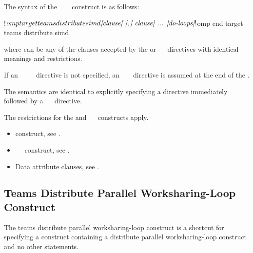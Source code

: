 \begin{fortranspecific}
The syntax of the ~~~ construct is as follows:

\begin{ompfPragma}
!$omp target teams distribute simd \plc{[clause[ [},\plc{] clause] ... ]}
    \plc{do-loops}
\plc{[}!$omp end target teams distribute simd\plc{]}
\end{ompfPragma}

where  can be any of the clauses accepted by the  or
~~ directives with identical meanings and restrictions.

If an ~~~~ directive is not specified, an
~  ~ directive is assumed at the end of the .
\end{fortranspecific}

\descr
The semantics are identical to explicitly specifying a  directive immediately
followed by a ~~ directive.

\restrictions
The restrictions for the  and ~~ constructs apply.


\crossreferences
\begin{itemize}
\item {} construct, see
.

\item {}~~ construct, see
.

\item Data attribute clauses, see
.
\end{itemize}











\subsection{Teams Distribute Parallel Worksharing-Loop Construct}
\label{subsec:Teams Distribute Parallel Worksharing-Loop Construct}
\summary
The teams distribute parallel worksharing-loop construct is a shortcut for specifying a 
construct containing a distribute parallel worksharing-loop construct and no other statements.

